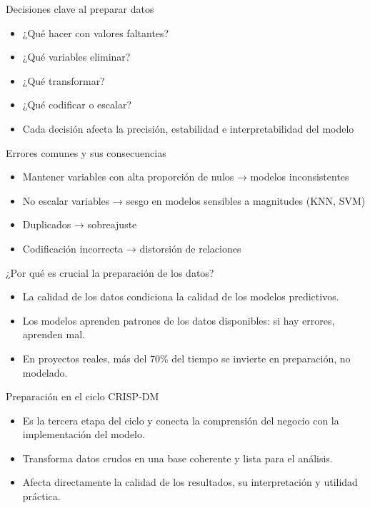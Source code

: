 \documentclass{beamer}
\begin{document}
\begin{frame}{Decisiones clave al preparar datos}
\begin{itemize}
    \item ¿Qué hacer con valores faltantes?
    \item ¿Qué variables eliminar?
    \item ¿Qué transformar?
    \item ¿Qué codificar o escalar?
    \item Cada decisión afecta la precisión, estabilidad e interpretabilidad del modelo
\end{itemize}
\end{frame}

\begin{frame}{Errores comunes y sus consecuencias}
\begin{itemize}
    \item Mantener variables con alta proporción de nulos → modelos inconsistentes
    \item No escalar variables → sesgo en modelos sensibles a magnitudes (KNN, SVM)
    \item Duplicados → sobreajuste
    \item Codificación incorrecta → distorsión de relaciones
\end{itemize}
\end{frame}


\begin{frame}{¿Por qué es crucial la preparación de los datos?}
\begin{itemize}
    \item La calidad de los datos condiciona la calidad de los modelos predictivos.
    \item Los modelos aprenden patrones de los datos disponibles: si hay errores, aprenden mal.
    \item En proyectos reales, más del 70\% del tiempo se invierte en preparación, no modelado.
\end{itemize}
\end{frame}

\begin{frame}{Preparación en el ciclo CRISP-DM}
\begin{itemize}
    \item Es la tercera etapa del ciclo y conecta la comprensión del negocio con la implementación del modelo.
    \item Transforma datos crudos en una base coherente y lista para el análisis.
    \item Afecta directamente la calidad de los resultados, su interpretación y utilidad práctica.
\end{itemize}
\end{frame}
\end{document}
